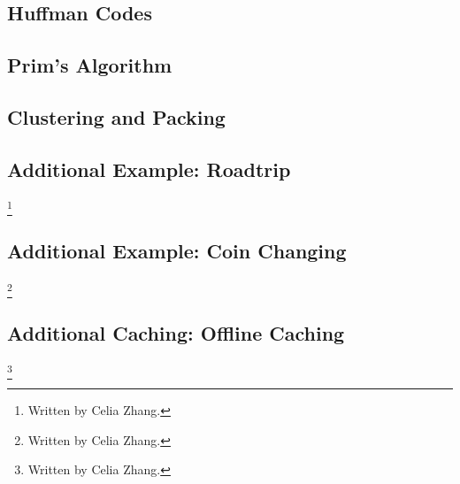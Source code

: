 \documentclass[10pt]{article}
\theoremstyle{plain}
\theoremstyle{definition}
\numberwithin{equation}{section}
\numberwithin{figure}{section}
\begin{document}
\subsection{Huffman Codes}

\subsection{Prim's Algorithm}

\subsection{Clustering and Packing}

\subsection{Additional Example: Roadtrip}\footnote{Written by Celia Zhang.}

\subsection{Additional Example: Coin Changing}\footnote{Written by Celia Zhang.}

\subsection{Additional Caching: Offline Caching}\footnote{Written by Celia Zhang.}
\end{document}

